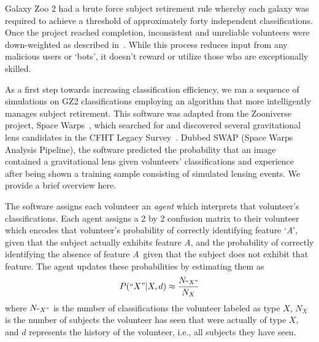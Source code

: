 \documentclass[twocolumn]{aastex6}
\newcommand{\A}{\textit{A}}
\newcommand{\N}{\textit{N}}
\begin{document}
Galaxy Zoo 2 had a brute force subject retirement rule whereby each galaxy 
was required to achieve a threshold of approximately forty independent classifications. 
Once the project reached completion, inconsistent and unreliable volunteers were
down-weighted as described in~\cite{Willett2013}.
While this process reduces input from any malicious users or `bots', it doesn't reward
 or utilize those who are exceptionally skilled. 

As a first step towards increasing classification efficiency, we ran a sequence of 
simulations on GZ2 classifications employing an algorithm that more intelligently
manages subject retirement. This software was adapted from the Zooniverse project, 
Space Warps~\citep{Marshall2016}, which searched for and discovered several 
gravitational lens candidates in the CFHT Legacy Survey~\citep{More2016}.  
Dubbed SWAP (Space Warps Analysis Pipeline),  
the software predicted the probability that an image contained a gravitational lens given 
volunteers' classifications and experience after being shown a training
sample consisting of simulated lensing events.  We provide a brief overview here.  

The software assigns each volunteer an \textit{agent} which interprets that volunteer's 
classifications. Each agent assigns a 2 by 2 confusion matrix to their volunteer which encodes
that volunteer's probability of correctly identifying feature `\A',  given that the subject 
actually exhibits feature \A, and the probability of correctly identifying
the absence of feature \A~given that the subject does not exhibit 
that feature. The agent updates these probabilities by estimating them as 
\begin{equation}
P(``X" | X, d) \approx \frac{N_{``X"}}{N_{X}}
\end{equation}
where $N_{``X"}$ is the number of classifications the volunteer labeled as type $X$, 
$N_X$ is the number of subjects the volunteer has seen that were actually of type $X$,
and $d$ represents the history of the volunteer, i.e., all subjects they have seen. 
\end{document}
